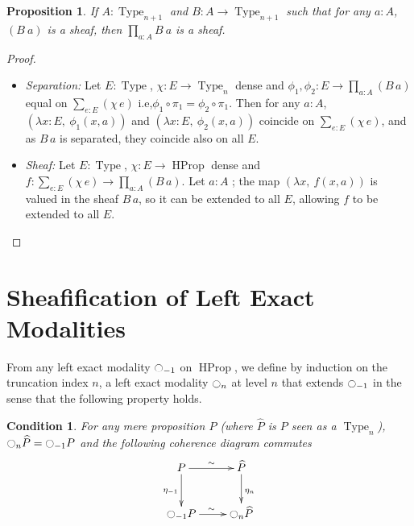 \documentclass[preprint,9pt,numbers]{sigplanconf}
\newtheorem{prop}[thm]{Proposition}
\newtheorem{cond}[thm]{Condition}
\newcommand{\mynote}[2]{
    \fbox{\bfseries\sffamily\scriptsize#1}
    {\small$\blacktriangleright$\textsf{\emph{#2}}$\blacktriangleleft$}~}
\newcommand\nt[1]{\mynote{NT}{#1}}
\newcommand{\ie}{i.e,\xspace}
\DeclareMathOperator{\Type}{Type}
\DeclareMathOperator{\HProp}{HProp}
\newcommand{\modal}{\ensuremath{\ocircle}}
\newenvironment{mymath}[1][-0em]{%
  \newcommand\mymathaux{\vspace{#1}}%
  \vspace{#1}%
  \begin{equation*}%
  }{ %
    \mymathaux%
  \end{equation*}}
\begin{document}
\begin{prop}\label{prop:sheaf-forall}
  If $A:\Type_{n+1}$ and $B:A \to \Type_{n+1}$ such that for any
  $a:A$, $(B~a)$ is a sheaf, then $\prod_{a:A}B~a$ is a sheaf.
\end{prop}
\begin{proof}
  \begin{itemize}
  \item {\em Separation:} Let $E:\Type$, $\chi:E \to \Type_n$ dense
    and $\phi_1,\phi_2:E\to \prod_{a:A} (B\, a)$ equal on
    $\sum_{e:E}(\chi\, e)$ \ie $\phi_1\circ \pi_1 = \phi_2\circ
    \pi_1$.
    Then for any $a:A$, $(\lambda x:E,~\phi_1(x, a))$
    and $(\lambda x:E,~\phi_2(x,a))$
    coincide on $\sum_{e:E}(\chi\, e)$, and as $B\, a$ is separated,
    they coincide also on all $E$.
  \item {\em Sheaf:} Let $E:\Type$, $\chi:E\to \HProp$ dense and
    $f:\sum_{e:E} (\chi\, e)\to \prod_{a:A} (B\,a)$. Let $a:A$ ; the
    map $(\lambda x,~f(x,a))$ is valued in the sheaf $B\, a$, so it
    can be extended to all $E$, allowing $f$ to be extended to all
    $E$. \qedhere
  \end{itemize}
\end{proof}

\section{Sheafification of Left Exact Modalities}
\label{sec:sheafification}


From any left exact modality $\modal_{-1}$ on $\HProp$, we define by
induction on the truncation index $n$, a
left exact modality $\modal_n$ at level $n$ that extends $\modal_{-1}$ in the
sense that the following property holds.
%
\begin{cond}\label{cond:hprop}
  For any mere proposition $P$ (where $\widehat P$ is $P$ seen as a
  $\Type_n$),  $\modal_n \widehat P = \modal_{-1} P$ and the
  following coherence diagram commutes
  \begin{mymath}\xymatrix{
    P \ar@{->}^{\sim}[r] \ar[d]_{\eta_{-1}} & \widehat P \ar[d]^{\eta_n} \\
    \modal_{-1} P \ar@{->}^{\sim}[r] & \modal_n \widehat P 
  }\end{mymath}%
\end{cond}
\end{document}
